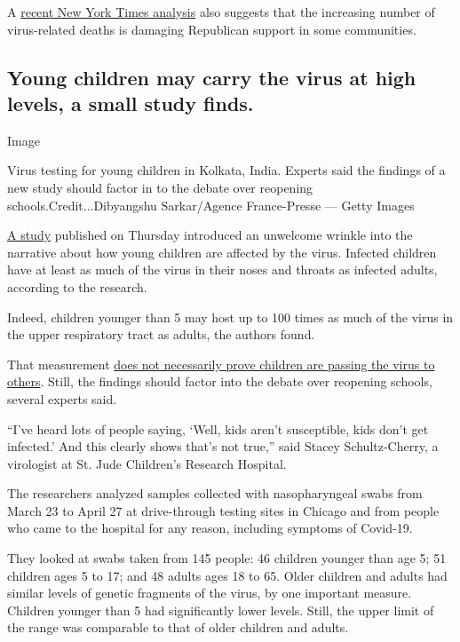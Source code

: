 A
\href{https://www.nytimes3xbfgragh.onion/2020/07/28/upshot/polling-trump-virus-election.html}{recent
New York Times analysis} also suggests that the increasing number of
virus-related deaths is damaging Republican support in some communities.

\hypertarget{young-children-may-carry-the-virus-at-high-levels-a-small-study-finds}{%
\subsection{Young children may carry the virus at high levels, a small
study
finds.}\label{young-children-may-carry-the-virus-at-high-levels-a-small-study-finds}}

Image

Virus testing for young children in Kolkata, India. Experts said the
findings of a new study should factor in to the debate over reopening
schools.Credit...Dibyangshu Sarkar/Agence France-Presse --- Getty Images

\href{https://jamanetwork.com/journals/jamapediatrics/fullarticle/2768952}{A
study} published on Thursday introduced an unwelcome wrinkle into the
narrative about how young children are affected by the virus. Infected
children have at least as much of the virus in their noses and throats
as infected adults, according to the research.

Indeed, children younger than 5 may host up to 100 times as much of the
virus in the upper respiratory tract as adults, the authors found.

That measurement
\href{https://www.nytimes3xbfgragh.onion/2020/07/30/health/coronavirus-children.html}{does
not necessarily prove children are passing the virus to others}. Still,
the findings should factor into the debate over reopening schools,
several experts said.

``I've heard lots of people saying, `Well, kids aren't susceptible, kids
don't get infected.' And this clearly shows that's not true,'' said
Stacey Schultz-Cherry, a virologist at St. Jude Children's Research
Hospital.

The researchers analyzed samples collected with nasopharyngeal swabs
from March 23 to April 27 at drive-through testing sites in Chicago and
from people who came to the hospital for any reason, including symptoms
of Covid-19.

They looked at swabs taken from 145 people: 46 children younger than age
5; 51 children ages 5 to 17; and 48 adults ages 18 to 65. Older children
and adults had similar levels of genetic fragments of the virus, by one
important measure. Children younger than 5 had significantly lower
levels. Still, the upper limit of the range was comparable to that of
older children and adults.

